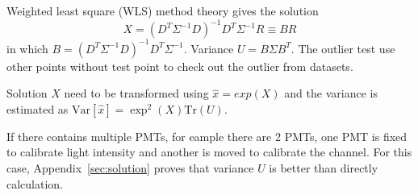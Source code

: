 Weighted least square (WLS) method theory gives the solution
\begin{equation}
    \label{equ:solution}
    X=(D^T\Sigma^{-1}D)^{-1}D^T\Sigma^{-1}R\equiv BR
\end{equation}
in which $B=(D^T\Sigma^{-1}D)^{-1}D^T\Sigma^{-1}$. Variance $U=B\Sigma B^T$\cite{Cowan1998StatisticalDA}\cite{AppliedRegression}. The outlier test use other points without test point to check out the outlier from datasets\cite{AppliedRegression}.

Solution $X$ need to be transformed using $\hat{x}=exp(X)$ and the variance is estimated as $\mathrm{Var}[\hat{x}]=\exp^2(X)\mathrm{Tr}(U)$.

If there contains multiple PMTs, for eample there are 2 PMTs, one PMT is fixed to calibrate light intensity and another is moved to calibrate the channel. For this case, Appendix~\ref{sec:solution} proves that variance $U$ is better than directly calculation.




